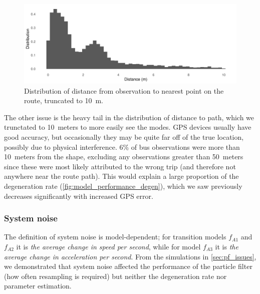 \begin{knitrout}\small
{}\color{fgcolor}\begin{figure}
\includegraphics[width=\maxwidth]{figure/pf_param_gps-1} \caption[Distribution of distance from observation to nearest point on the route, truncated to 10~m]{Distribution of distance from observation to nearest point on the route, truncated to 10~m.}\label{fig:pf_param_gps}
\end{figure}


\end{knitrout}

The other issue is the heavy tail in the distribution of distance to path, which we trunctated to 10~meters to more easily see the modes. GPS devices usually have good accuracy, but occasionally they may be quite far off of the true location, possibly due to physical interference. 6\% of bus observations were more than 10~meters from the shape, excluding any observations greater than 50~meters since these were most likely attributed to the wrong trip (and therefore not anywhere near the route path). This would explain a large proportion of the degeneration rate (\cref{fig:model_performance_degen}), which we saw previously decreases significantly with increased GPS error.





\subsubsection{System noise}
\label{sec:pf_params_noise}

The definition of system noise is model-dependent; for transition models $f_{A1}$ and $f_{A2}$ it is \emph{the average change in speed per second}, while for model $f_{A3}$ it is \emph{the average change in acceleration per second}. From the simulations in \cref{sec:pf_issues}, we demonstrated that system noise affected the performance of the particle filter (how often resampling is required) but neither the degeneration rate nor parameter estimation.

